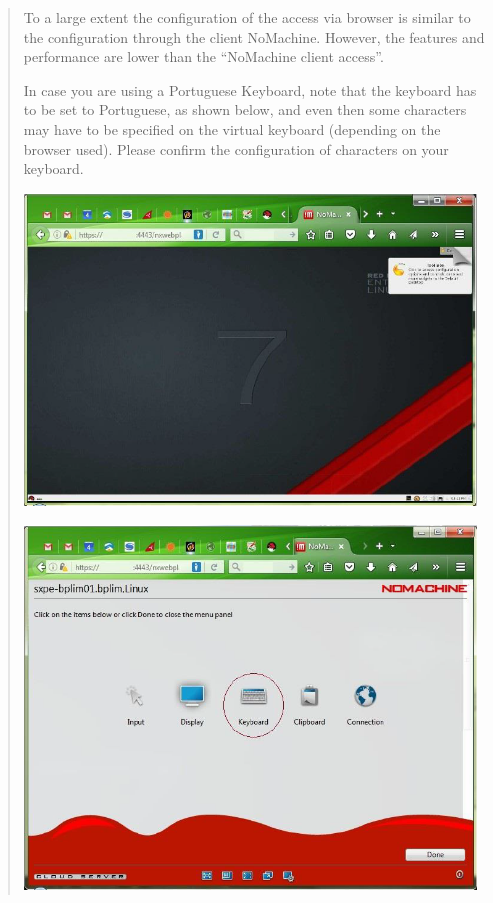 \documentclass[]{book}
\begin{document}
\begin{quote}
To a large extent the configuration of the access via browser is
similar to the configuration through the client NoMachine. However,
the features and performance are lower than the ``NoMachine client
access''.

In case you are using a Portuguese Keyboard, note that the keyboard
has to be set to Portuguese, as shown below, and even then some
characters may have to be specified on the virtual keyboard (depending
on the browser used). Please confirm the configuration of characters
on your keyboard.

\includegraphics[width=4.72441in,height=3.26627in]{./media/image41.png}

\includegraphics[width=4.72441in,height=3.80386in]{./media/image42.png}


\end{quote}
\end{document}
